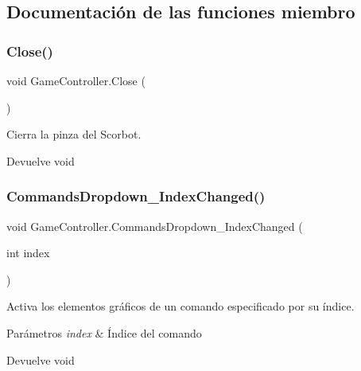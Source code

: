 \subsection{Documentación de las funciones miembro}
\mbox{\label{class_game_controller_a232d433ba9f07944bcc274841bf8cc7c}} 
\subsubsection{\texorpdfstring{Close()}{Close()}}
{\footnotesize\ttfamily void Game\+Controller.\+Close (\begin{DoxyParamCaption}{ }\end{DoxyParamCaption})\hspace{0.3cm}{\ttfamily [inline]}}

Cierra la pinza del Scorbot. \begin{DoxyReturn}{Devuelve}
void 
\end{DoxyReturn}
\mbox{\label{class_game_controller_a2ea8f0a42452c5dd938feed2713f87c7}} 
\subsubsection{\texorpdfstring{CommandsDropdown\_IndexChanged()}{CommandsDropdown\_IndexChanged()}}
{\footnotesize\ttfamily void Game\+Controller.\+Commands\+Dropdown\+\_\+\+Index\+Changed (\begin{DoxyParamCaption}\item[{int}]{index }\end{DoxyParamCaption})\hspace{0.3cm}{\ttfamily [inline]}}

Activa los elementos gráficos de un comando especificado por su índice. 
\begin{DoxyParams}{Parámetros}
{\em index} & Índice del comando \\
\hline
\end{DoxyParams}
\begin{DoxyReturn}{Devuelve}
void 
\end{DoxyReturn}
\mbox{\label{class_game_controller_ae9fc70a12ad70871780529854ea12d9c}} 
